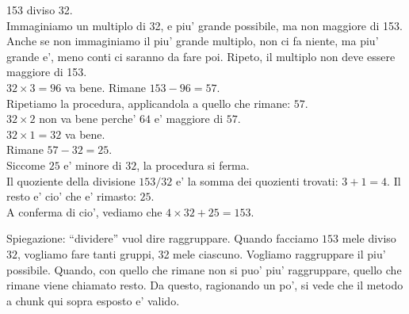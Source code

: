 \documentclass[a4paper]{article}
\begin{document}
\begin{exemp}
	153 diviso 32.\\
	Immaginiamo un multiplo di 32, e piu' grande possibile, ma non maggiore di 153. Anche se non immaginiamo il piu' grande multiplo, non ci fa niente, ma piu' grande e', meno conti ci saranno da fare poi. Ripeto, il multiplo non deve essere maggiore di 153.\\
	$32\times 3 = 96$ va bene.
	Rimane $153 - 96 = 57$.\\
	Ripetiamo la procedura, applicandola a quello che rimane: $57$.\\
	$32 \times 2$ non va bene perche' $64$ e' maggiore di $57$.\\
	$32 \times 1 = 32$ va bene.\\
	Rimane $57-32=25$.\\
	Siccome $25$ e' minore di $32$, la procedura si ferma.\\
	Il quoziente della divisione $153 / 32$ e' la somma dei quozienti trovati: $3+1=4$. Il resto e' cio' che e' rimasto: $25$.\\
	A conferma di cio', vediamo che $4\times 32 + 25 = 153$.	
\end{exemp}

Spiegazione: ``dividere'' vuol dire raggruppare. Quando facciamo $153$ mele diviso $32$, vogliamo fare tanti gruppi, 32 mele ciascuno. Vogliamo raggruppare il piu' possibile. Quando, con quello che rimane non si puo' piu' raggruppare, quello che rimane viene chiamato resto. Da questo, ragionando un po', si vede che il metodo a chunk qui sopra esposto e' valido.

\printindex
\end{document}
